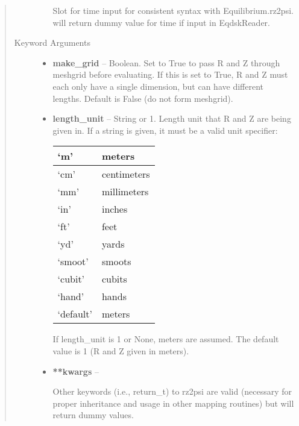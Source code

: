 \documentclass[letterpaper,10pt,english]{sphinxmanual}
\begin{document}
\begin{fulllineitems}
\begin{fulllineitems}
\begin{quote}
\begin{description}
\begin{itemize}
Slot for time input for consistent syntax with Equilibrium.rz2psi.
will return dummy value for time if input in EqdskReader.

\end{itemize}

\item[{Keyword Arguments}] \leavevmode\begin{itemize}
\item {} 
\textbf{make\_grid} --
Boolean.
Set to True to pass R and Z through meshgrid
before evaluating. If this is set to True, R and Z must each
only have a single dimension, but can have different lengths.
Default is False (do not form meshgrid).

\item {} 
\textbf{length\_unit} --
String or 1.
Length unit that R and Z are being given
in. If a string is given, it must be a valid unit specifier:

\begin{tabulary}{\linewidth}{|L|L|}
\hline

`m'
 & 
meters
\\\hline

`cm'
 & 
centimeters
\\\hline

`mm'
 & 
millimeters
\\\hline

`in'
 & 
inches
\\\hline

`ft'
 & 
feet
\\\hline

`yd'
 & 
yards
\\\hline

`smoot'
 & 
smoots
\\\hline

`cubit'
 & 
cubits
\\\hline

`hand'
 & 
hands
\\\hline

`default'
 & 
meters
\\\hline
\end{tabulary}


If length\_unit is 1 or None, meters are assumed. The default
value is 1 (R and Z given in meters).

\item {} 
\textbf{**kwargs} --

Other keywords (i.e., return\_t) to rz2psi are valid
(necessary for proper inheritance and usage in other mapping routines)
but will return dummy values.


\end{itemize}
\end{description}
\end{quote}
\end{fulllineitems}
\end{fulllineitems}
\end{document}
